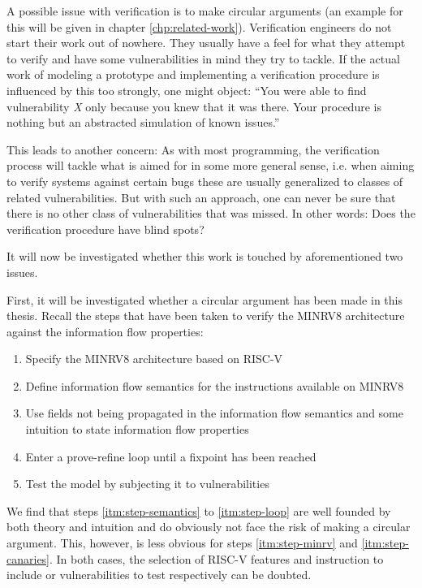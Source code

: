 A possible issue with verification is to make circular arguments (an example for this will be given in chapter \ref{chp:related-work}).
Verification engineers do not start their work out of nowhere.
They usually have a feel for what they attempt to verify and have some vulnerabilities in mind they try to tackle.
If the actual work of modeling a prototype and implementing a verification procedure is influenced by this too strongly, one might object:
\enquote{You were able to find vulnerability \textit{X} only because you knew that it was there. Your procedure is nothing but an abstracted simulation of known issues.}

This leads to another concern:
As with most programming, the verification process will tackle what is aimed for in some more general sense, i.e. when aiming to verify systems against certain bugs these are usually generalized to classes of related vulnerabilities.
But with such an approach, one can never be sure that there is no other class of vulnerabilities that was missed.
In other words: Does the verification procedure have blind spots?

It will now be investigated whether this work is touched by aforementioned two issues.

First, it will be investigated whether a circular argument has been made in this thesis.
Recall the steps that have been taken to verify the MINRV8 architecture against the information flow properties:
\begin{enumerate}
    \item \label{itm:step-minrv}
    Specify the MINRV8 architecture based on RISC-V
    \item \label{itm:step-semantics}
    Define information flow semantics for the instructions available on MINRV8
    \item \label{itm:step-properties}
    Use fields not being propagated in the information flow semantics and some intuition to state information flow properties
    \item \label{itm:step-loop}
    Enter a prove-refine loop until a fixpoint has been reached
    \item \label{itm:step-canaries}
    Test the model by subjecting it to vulnerabilities
\end{enumerate}

We find that steps \ref{itm:step-semantics} to \ref{itm:step-loop} are well founded by both theory and intuition and do obviously not face the risk of making a circular argument.
This, however, is less obvious for steps \ref{itm:step-minrv} and \ref{itm:step-canaries}.
In both cases, the selection of RISC-V features and instruction to include or vulnerabilities to test respectively can be doubted.

